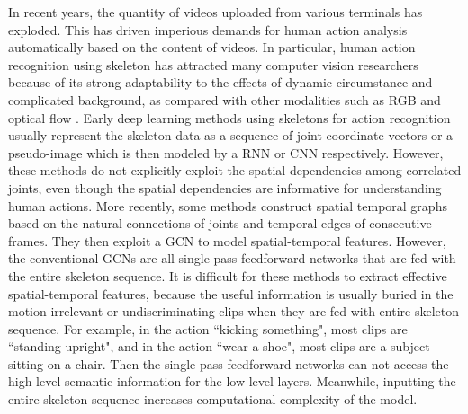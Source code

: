 \documentclass[runningheads]{llncs}
\begin{document}
In recent years, the quantity of videos uploaded from various terminals has exploded. This has driven imperious demands for human action analysis automatically based on the content of videos. In particular, human action recognition using skeleton has attracted many computer vision researchers because of its strong adaptability to the effects of dynamic circumstance and complicated background, as compared with other modalities such as RGB \cite{karpathy2014large} and optical flow \cite{simonyan2014two}. Early deep learning methods using skeletons for action recognition usually represent the skeleton data as a sequence of joint-coordinate vectors \cite{du2015hierarchical,song2017end,zhang2017view,li2018independently} or a pseudo-image \cite{ke2017new,liu2017enhanced,liu2017two} which is then modeled by a RNN or CNN respectively. However, these methods do not explicitly exploit the spatial dependencies among correlated joints, even though the spatial dependencies are informative for understanding human actions. More recently, some methods \cite{yan2018spatial,shi2019two,shi2019skeleton,li2019actional} construct spatial temporal graphs based on the natural connections of joints and temporal edges of consecutive frames. They then exploit a GCN to model spatial-temporal features.
However, the conventional GCNs are all single-pass feedforward networks that are fed with the entire skeleton sequence. It is difficult for these methods to extract effective spatial-temporal features, because the useful information is usually buried in the motion-irrelevant or undiscriminating clips when they are fed with entire skeleton sequence. For example, in the action ``kicking something", most clips are ``standing upright", and in the action ``wear a shoe", most clips are a subject sitting on a chair.
Then the single-pass feedforward networks can not access the high-level semantic information for the low-level layers. Meanwhile, inputting the entire skeleton sequence increases computational complexity of the model.
\end{document}
